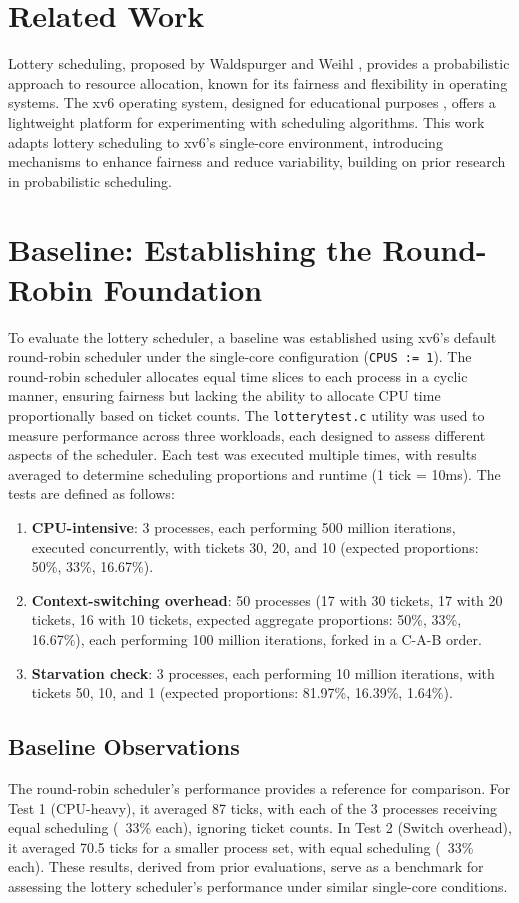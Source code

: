 \documentclass{article}
\begin{document}
\section{Related Work}
Lottery scheduling, proposed by Waldspurger and Weihl \cite{waldspurger1994lottery}, provides a probabilistic approach to resource allocation, known for its fairness and flexibility in operating systems. The xv6 operating system, designed for educational purposes \cite{xv6}, offers a lightweight platform for experimenting with scheduling algorithms. This work adapts lottery scheduling to xv6’s single-core environment, introducing mechanisms to enhance fairness and reduce variability, building on prior research in probabilistic scheduling.

\section{Baseline: Establishing the Round-Robin Foundation}
To evaluate the lottery scheduler, a baseline was established using xv6’s default round-robin scheduler under the single-core configuration (\texttt{CPUS := 1}). The round-robin scheduler allocates equal time slices to each process in a cyclic manner, ensuring fairness but lacking the ability to allocate CPU time proportionally based on ticket counts. The \texttt{lotterytest.c} utility was used to measure performance across three workloads, each designed to assess different aspects of the scheduler. Each test was executed multiple times, with results averaged to determine scheduling proportions and runtime (1 tick = 10ms). The tests are defined as follows:

\begin{enumerate}[label=\arabic*.]
    \item \textbf{CPU-intensive}: 3 processes, each performing 500 million iterations, executed concurrently, with tickets 30, 20, and 10 (expected proportions: 50\%, 33\%, 16.67\%).
    \item \textbf{Context-switching overhead}: 50 processes (17 with 30 tickets, 17 with 20 tickets, 16 with 10 tickets, expected aggregate proportions: 50\%, 33\%, 16.67\%), each performing 100 million iterations, forked in a C-A-B order.
    \item \textbf{Starvation check}: 3 processes, each performing 10 million iterations, with tickets 50, 10, and 1 (expected proportions: 81.97\%, 16.39\%, 1.64\%).
\end{enumerate}

\subsection{Baseline Observations}
The round-robin scheduler’s performance provides a reference for comparison. For Test 1 (CPU-heavy), it averaged 87 ticks, with each of the 3 processes receiving equal scheduling (~33\% each), ignoring ticket counts. In Test 2 (Switch overhead), it averaged 70.5 ticks for a smaller process set, with equal scheduling (~33\% each). These results, derived from prior evaluations, serve as a benchmark for assessing the lottery scheduler’s performance under similar single-core conditions.
\end{document}
